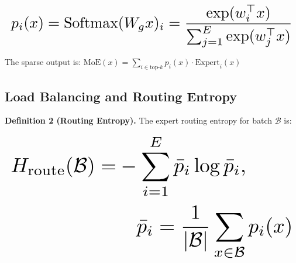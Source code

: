 \documentclass[10pt,journal,compsoc,twocolumn]{IEEEtran}
\begin{document}
\begin{equation}
\resizebox{\columnwidth}{!}{$\displaystyle
\begin{aligned}
p_i(x) = \text{Softmax}(W_g x)_i = \frac{\exp(w_i^\top x)}{\sum_{j=1}^E \exp(w_j^\top x)}
\end{aligned}
$}
\end{equation}



























The sparse output is: $\text{MoE}(x) = \sum_{i \in \text{top-}k} p_i(x) \cdot \text{Expert}_i(x)$


\subsection{Load Balancing and Routing Entropy}


\textbf{Definition 2 (Routing Entropy).} The expert routing entropy for batch $\mathcal{B}$ is:



























\begin{equation}
\resizebox{\columnwidth}{!}{$\displaystyle
\begin{aligned}
H_{\text{route}}(\mathcal{B}) = & -\sum_{i=1}^E \bar{p}_i \log \bar{p}_i, \\
& \quad \bar{p}_i = \frac{1}{|\mathcal{B}|}\sum_{x \in \mathcal{B}} p_i(x)
\end{aligned}
$}
\end{equation}
\end{document}
